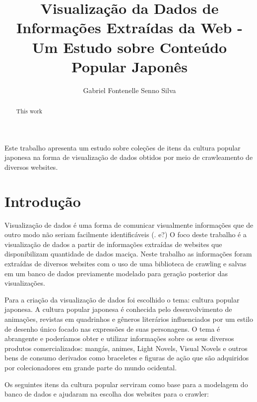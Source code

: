 \documentclass[12pt]{article}
\title{Visualização da Dados de Informações Extraídas da Web - Um Estudo sobre Conteúdo Popular Japonês}
\author{Gabriel Fontenelle Senno Silva\inst{1}}
\begin{document}
 
\maketitle

\begin{abstract}

This work 
\end{abstract}
     
\begin{resumo} 


Este trabalho apresenta um estudo sobre coleções de itens da cultura popular japonesa na forma de visualização de dados obtidos por meio de crawleamento de diversos websites.

\end{resumo}


\section{Introdução}

Visualização de dados é uma forma de comunicar visualmente informações que de outro modo não seriam facilmente identificáveis (. e?) O foco deste trabalho é a visualização de dados a partir de informações extraídas de websites que disponibilizam quantidade de dados maciça. Neste trabalho as informações foram extraídas de diversos websites com o uso de uma biblioteca de crawling e salvas em um banco de dados previamente modelado para geração posterior das visualizações.

Para a criação da visualização de dados foi escolhido o tema: cultura popular japonesa. A cultura popular japonesa é conhecida pelo desenvolvimento de animações, revistas em quadrinhos e gêneros literários influenciados por um estilo de desenho único focado nas expressões de suas personagens. O tema é abrangente e poderíamos obter e utilizar informações sobre os seus diversos produtos comercializados: mangás, animes, Light Novels, Visual Novels e outros bens de consumo derivados como braceletes e figuras de ação que são adquiridos por colecionadores em grande parte do mundo ocidental.


Os seguintes itens da cultura popular serviram como base para a modelagem do banco de dados e ajudaram na escolha dos websites para o crawler:
\end{document}
